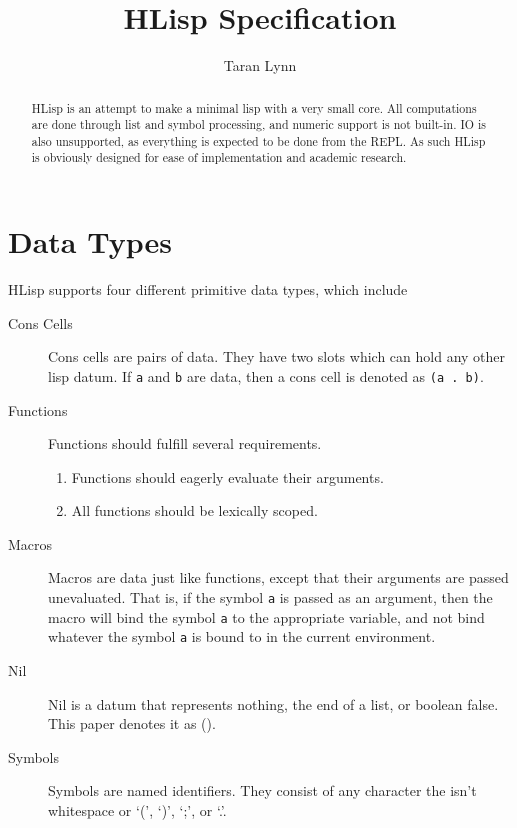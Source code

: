 \documentclass[12pt]{article}
\title{HLisp Specification}
\author{Taran Lynn}
\begin{document}
\maketitle

\begin{abstract}
  HLisp is an attempt to make a minimal lisp with a very small core. All
  computations are done through list and symbol processing, and numeric support
  is not built-in. IO is also unsupported, as everything is expected to be done
  from the REPL. As such HLisp is obviously designed for ease of implementation
  and academic research.
\end{abstract}

\tableofcontents

\pagebreak



\section{Data Types}

HLisp supports four different primitive data types, which include

\begin{description}
\item[Cons Cells] Cons cells are pairs of data. They have two slots which can
  hold any other lisp datum. If \verb!a! and \verb!b! are data, then a cons
  cell is denoted as \verb!(a . b)!.

\item[Functions] Functions should fulfill several requirements.
  \begin{enumerate}
  \item Functions should eagerly evaluate their arguments.

  \item All functions should be lexically scoped.
  \end{enumerate}

\item[Macros] Macros are data just like functions, except that their arguments
  are passed unevaluated. That is, if the symbol \verb!a! is passed as an
  argument, then the macro will bind the symbol \verb!a! to the appropriate
  variable, and not bind whatever the symbol \verb!a! is bound to in the current
  environment.

\item[Nil] Nil is a datum that represents nothing, the end of a list, or boolean
  false. This paper denotes it as ().

\item[Symbols] Symbols are named identifiers. They consist of any character the
  isn't whitespace or `(', `)', `;', or `.'.
\end{description}
\end{document}
